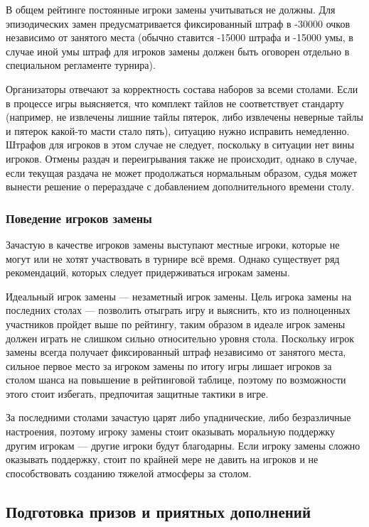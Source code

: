 В общем рейтинге постоянные игроки замены учитываться не должны. Для эпизодических замен предусматривается фиксированный штраф в -30000 очков независимо от занятого места (обычно ставится -15000 штрафа и -15000 умы, в случае иной умы штраф для игроков замены должен быть оговорен отдельно в специальном регламенте турнира).

Организаторы отвечают за корректность состава наборов за всеми столами. Если в процессе игры выясняется, что комплект тайлов не соответствует стандарту (например, не извлечены лишние тайлы пятерок, либо извлечены неверные тайлы и пятерок какой-то масти стало пять), ситуацию нужно исправить немедленно. Штрафов для игроков в этом случае не следует, поскольку в ситуации нет вины игроков. Отмены раздач и переигрывания также не происходит, однако в случае, если текущая раздача не может продолжаться нормальным образом, судья может вынести решение о перераздаче с добавлением дополнительного времени столу.

\subsubsection{Поведение игроков замены}

Зачастую в качестве игроков замены выступают местные игроки, которые не могут или не хотят участвовать в турнире всё время. Однако существует ряд рекомендаций, которых следует придерживаться игрокам замены.

Идеальный игрок замены --- незаметный игрок замены. Цель игрока замены на последних столах --- позволить отыграть игру и выяснить, кто из полноценных участников пройдет выше по рейтингу, таким образом в идеале игрок замены должен играть не слишком сильно относительно уровня стола. Поскольку игрок замены всегда получает фиксированный штраф независимо от занятого места, сильное первое место за игроком замены по итогу игры лишает игроков за столом шанса на повышение в рейтинговой таблице, поэтому по возможности этого стоит избегать, предпочитая защитные тактики в игре.

За последними столами зачастую царят либо упаднические, либо безразличные настроения, поэтому игроку замены стоит оказывать моральную поддержку другим игрокам --- другие игроки будут благодарны. Если игроку замены сложно оказывать поддержку, стоит по крайней мере не давить на игроков и не способствовать созданию тяжелой атмосферы за столом.

\subsection{Подготовка призов и приятных дополнений}

